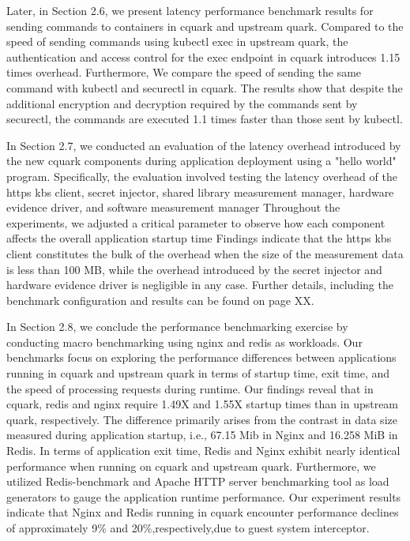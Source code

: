 Later, in Section 2.6, we present latency performance benchmark results for sending commands to containers in cquark and upstream quark. Compared to the speed of sending commands using kubectl exec in upstream quark, the authentication and access control for the exec endpoint in cquark introduces 1.15 times overhead. Furthermore, We compare the speed of sending the same command with kubectl and securectl in cquark. The results show that despite the additional encryption and decryption required by the commands sent by securectl, the commands are executed 1.1 times faster than those sent by kubectl.


In Section 2.7, we conducted an evaluation of the latency overhead introduced by the new cquark components during application deployment using a "hello world" program.  Specifically, the evaluation involved testing the latency overhead of the https kbs client, secret injector, shared library measurement manager, hardware evidence driver, and software measurement manager Throughout the experiments, we adjusted a critical parameter to observe how each component affects the overall application startup time Findings indicate that the https kbs client constitutes the bulk of the overhead when the size of the measurement data is less than 100 MB, while the overhead introduced by the secret injector and hardware evidence driver is negligible in any case. Further details, including the benchmark configuration and results can be found on page XX.


In Section 2.8, we conclude the performance benchmarking exercise by conducting macro benchmarking using nginx and redis as workloads. Our benchmarks focus on exploring the performance differences between applications running in cquark and upstream quark in terms of startup time, exit time, and the speed of processing requests during runtime. Our findings reveal that in cquark, redis and nginx require 1.49X and 1.55X startup times than in upstream quark, respectively. The difference primarily arises from the contrast in data size measured during application startup, i.e., 67.15 Mib in Nginx and 16.258 MiB in Redis. In terms of application exit time, Redis and Nginx exhibit nearly identical performance when running on cquark and upstream quark. Furthermore, we utilized Redis-benchmark and Apache HTTP server benchmarking tool as load generators to gauge the application runtime performance. Our experiment results indicate that Nginx and Redis running in cquark encounter performance declines of approximately 9\% and 20\%,respectively,due to guest system interceptor.


